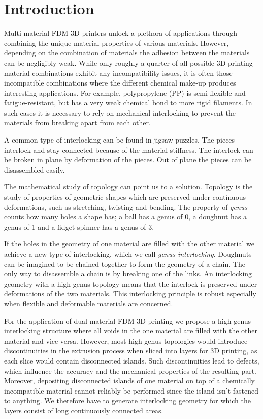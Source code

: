 \section{Introduction}
Multi-material FDM 3D printers unlock a plethora of applications through combining the unique material properties of various materials.
However, depending on the combination of materials the adhesion between the materials can be negligibly weak.
While only roughly a quarter of all possible 3D printing material combinations exhibit any incompatibility issues,
it is often those incompatible combinations where the different chemical make-up produces interesting applications.
For example, polypropylene (PP) is semi-flexible and fatigue-resistant, but has a very weak chemical bond to more rigid filaments.
In such cases it is necessary to rely on mechanical interlocking to prevent the materials from breaking apart from each other.

A common type of interlocking can be found in jigsaw puzzles.
The pieces interlock and stay connected because of the material stiffness.
The interlock can be broken in plane by deformation of the pieces.
Out of plane the pieces can be disassembled easily.

The mathematical study of topology can point us to a solution.
Topology is the study of properties of geometric shapes which are preserved under continuous deformations, such as stretching, twisting and bending.
The property of \emph{genus} counts how many holes a shape has;
a ball has a genus of 0, a doughnut has a genus of 1 and a fidget spinner has a genus of 3.

If the holes in the geometry of one material are filled with the other material we achieve a new type of interlocking, which we call \emph{genus interlocking}.
Doughnuts can be imagined to be chained together to form the geometry of a chain.
The only way to disassemble a chain is by breaking one of the links.
An interlocking geometry with a high genus topology means that the interlock is preserved under deformations of the two materials.
This interlocking principle is robust especially when flexible and deformable materials are concerned.

For the application of dual material FDM 3D printing we propose a high genus interlocking structure where all voids in the one material are filled with the other material and vice versa.
However, most high genus topologies would introduce discontinuities in the extrusion process when sliced into layers for 3D printing, as each slice would contain disconnected islands.
Such discontinuities lead to defects, which influence the accuracy and the mechanical properties of the resulting part.
Moreover, depositing disconnected islands of one material on top of a chemically incompatible material cannot reliably be performed since the island isn't fastened to anything.
We therefore have to generate interlocking geometry for which the layers consist of long continuously connected areas.

